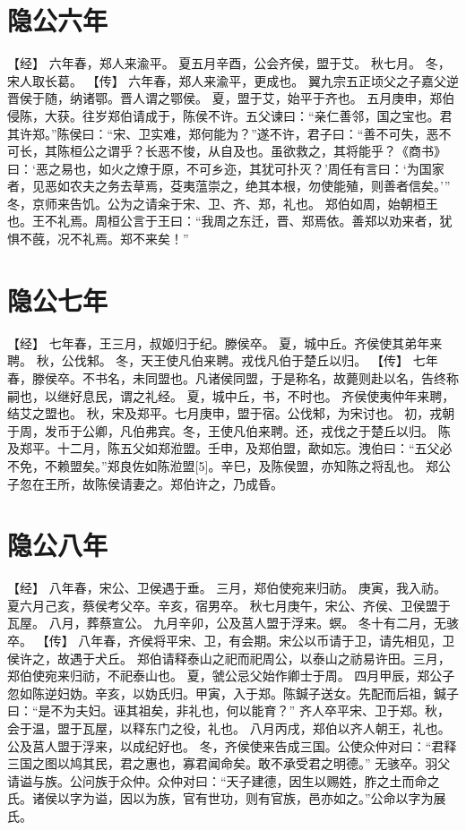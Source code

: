 \documentclass[a4paper,12pt,UTF8,twoside]{ctexbook}
\begin{document}
\section{隐公六年}

【经】
六年春，郑人来渝平。
夏五月辛酉，公会齐侯，盟于艾。
秋七月。
冬，宋人取长葛。
【传】
六年春，郑人来渝平，更成也。
翼九宗五正顷父之子嘉父逆晋侯于随，纳诸鄂。晋人谓之鄂侯。
夏，盟于艾，始平于齐也。
五月庚申，郑伯侵陈，大获。往岁郑伯请成于，陈侯不许。五父谏曰：“亲仁善邻，国之宝也。君其许郑。”陈侯曰：“宋、卫实难，郑何能为？”遂不许，君子曰：“善不可失，恶不可长，其陈桓公之谓乎？长恶不悛，从自及也。虽欲救之，其将能乎？《商书》曰：‘恶之易也，如火之燎于原，不可乡迩，其犹可扑灭？’周任有言曰：‘为国家者，见恶如农夫之务去草焉，芟夷蕰崇之，绝其本根，勿使能殖，则善者信矣。’”
冬，京师来告饥。公为之请籴于宋、卫、齐、郑，礼也。
郑伯如周，始朝桓王也。王不礼焉。周桓公言于王曰：“我周之东迁，晋、郑焉依。善郑以劝来者，犹惧不蔇，况不礼焉。郑不来矣！”

\section{隐公七年}

【经】
七年春，王三月，叔姬归于纪。滕侯卒。
夏，城中丘。齐侯使其弟年来聘。
秋，公伐邾。
冬，天王使凡伯来聘。戎伐凡伯于楚丘以归。
【传】
七年春，滕侯卒。不书名，未同盟也。凡诸侯同盟，于是称名，故薨则赴以名，告终称嗣也，以继好息民，谓之礼经。
夏，城中丘，书，不时也。
齐侯使夷仲年来聘，结艾之盟也。
秋，宋及郑平。七月庚申，盟于宿。公伐邾，为宋讨也。
初，戎朝于周，发币于公卿，凡伯弗宾。冬，王使凡伯来聘。还，戎伐之于楚丘以归。
陈及郑平。十二月，陈五父如郑涖盟。壬申，及郑伯盟，歃如忘。洩伯曰：“五父必不免，不赖盟矣。”郑良佐如陈涖盟[5]。辛巳，及陈侯盟，亦知陈之将乱也。
郑公子忽在王所，故陈侯请妻之。郑伯许之，乃成昏。

\section{隐公八年}

【经】
八年春，宋公、卫侯遇于垂。
三月，郑伯使宛来归祊。
庚寅，我入祊。
夏六月己亥，蔡侯考父卒。辛亥，宿男卒。
秋七月庚午，宋公、齐侯、卫侯盟于瓦屋。
八月，葬蔡宣公。
九月辛卯，公及莒人盟于浮来。螟。
冬十有二月，无骇卒。
【传】
八年春，齐侯将平宋、卫，有会期。宋公以币请于卫，请先相见，卫侯许之，故遇于犬丘。
郑伯请释泰山之祀而祀周公，以泰山之祊易许田。三月，郑伯使宛来归祊，不祀泰山也。
夏，虢公忌父始作卿士于周。
四月甲辰，郑公子忽如陈逆妇妫。辛亥，以妫氏归。甲寅，入于郑。陈鍼子送女。先配而后祖，鍼子曰：“是不为夫妇。诬其祖矣，非礼也，何以能育？”
齐人卒平宋、卫于郑。秋，会于温，盟于瓦屋，以释东门之役，礼也。
八月丙戌，郑伯以齐人朝王，礼也。
公及莒人盟于浮来，以成纪好也。
冬，齐侯使来告成三国。公使众仲对曰：“君释三国之图以鸠其民，君之惠也，寡君闻命矣。敢不承受君之明德。”
无骇卒。羽父请谥与族。公问族于众仲。众仲对曰：“天子建德，因生以赐姓，胙之土而命之氏。诸侯以字为谥，因以为族，官有世功，则有官族，邑亦如之。”公命以字为展氏。
\end{document}
